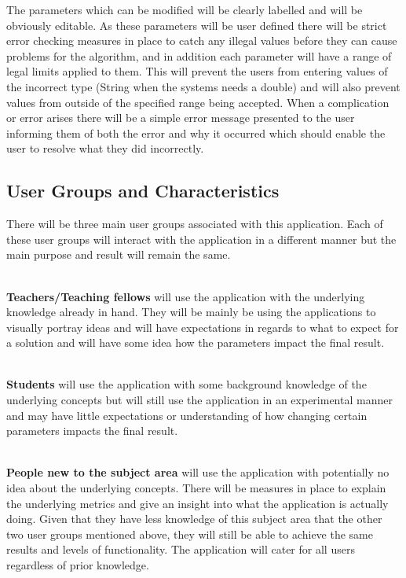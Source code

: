 \documentclass[10pt,a4paper]{article}
\begin{document}
The parameters which can be modified will be clearly labelled and will be obviously editable. As these parameters will be user defined there will be strict error checking measures in place to catch any illegal values before they can cause problems for the algorithm, and in addition each parameter will have a range of legal limits applied to them. This will prevent the users from entering values of the incorrect type (String when the systems needs a double) and will also prevent values from outside of the specified range being accepted. When a complication or error arises there will be a simple error message presented to the user informing them of both the error and why it occurred which should enable the user to resolve what they did incorrectly.

\subsection{User Groups and Characteristics}
\label{ssec:usergroups}
There will be three main user groups associated with this application. Each of these user groups will interact with the application in a different manner but the main purpose and result will remain the same.

\noindent \\
\textbf{Teachers/Teaching fellows} will use the application with the underlying knowledge already in hand. They will be mainly be using the applications to visually portray ideas and will have expectations in regards to what to expect for a solution and will have some idea how the parameters impact the final result.

\noindent \\
\textbf{Students} will use the application with some background knowledge of the underlying concepts but will still use the application in an experimental manner and may have little expectations or understanding of how changing certain parameters impacts the final result. 

\noindent \\
\textbf{People new to the subject area} will use the application with potentially no idea about the underlying concepts. There will be measures in place to explain the underlying metrics and give an insight into what the application is actually doing. Given that they have less knowledge of this subject area that the other two user groups mentioned above, they will still be able to achieve the same results and levels of functionality. The application will cater for all users regardless of prior knowledge.
\end{document}
